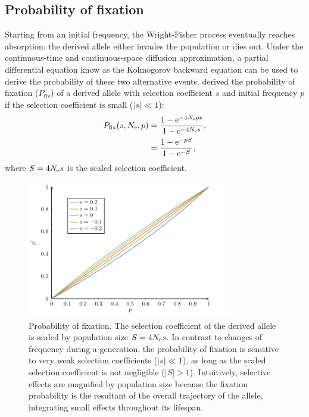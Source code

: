 \subsection{Probability of fixation}

Starting from an initial frequency, the Wright-Fisher process eventually reaches absorption: the derived \gls{allele} either invades the population or dies out.
Under the continuous-time and continuous-space diffusion approximation, a partial differential equation know as the Kolmogorov backward equation can be used to derive the probability of these two alternative events.
\citet{Kimura1962} derived the probability of fixation ($P_{\mathrm{fix}}$) of a derived \gls{allele} with selection coefficient $s$ and initial frequency $p$ if the selection coefficient is small ($|s| \ll 1$):
\begin{align}
    P_{\mathrm{fix}}(s, N_{\textrm{e}}, p) & = \dfrac{1 - \mathrm{e}^{-4 N_{\textrm{e}} p s }}{1 - \mathrm{e}^{-4 N_{\textrm{e}} s}},\\
    & = \dfrac{1 - \mathrm{e}^{- p S }}{1 - \mathrm{e}^{-S}},
\end{align}
where $S = 4 N_{\textrm{e}} s$ is the scaled selection coefficient.
\begin{figure}[h]
    \centering
    \includegraphics[width=0.8\textwidth, page=3] {figures.pdf}
    \caption[Probability of fixation]{
    Probability of fixation.
    The selection coefficient of the derived \gls{allele} is scaled by population size $S=4 N_{\textrm{e}} s$.
    In contrast to changes of frequency during a generation, the probability of fixation is sensitive to very weak selection coefficients ($|s| \ll 1$), as long as the scaled selection coefficient is not negligible ($|S| > 1$).
    Intuitively, selective effects are magnified by population size because the fixation probability is the resultant of the overall trajectory of the \gls{allele}, integrating small effects throughout its lifespan. }
\end{figure}

